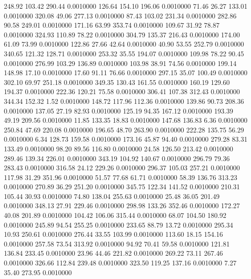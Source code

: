  248.92  103.42  290.44   0.0010000
 126.64  154.10  196.06   0.0010000
  71.46   26.27  133.01   0.0010000
 320.08   49.06  277.13   0.0010000
  87.43  103.02  231.34   0.0010000
 282.86   90.58  249.01   0.0010000
 171.16   63.99  353.74   0.0010000
 109.67   31.92   78.87   0.0010000
 324.93  110.89   78.22   0.0010000
 304.79  135.37  216.43   0.0010000
 174.00   61.09   73.99   0.0010000
 122.86   27.66   42.64   0.0010000
  40.90   53.55  252.79   0.0010000
 340.65  121.32  128.71   0.0010000
 253.32   35.55  194.07   0.0010000
 109.98   78.22   90.45   0.0010000
 276.99  103.29  136.89   0.0010000
 103.98   38.91   74.56   0.0010000
 199.14  148.98   17.10   0.0010000
  17.60   91.11   76.66   0.0010000
 297.15   35.07  100.49   0.0010000
 302.10   69.97  251.18   0.0010000
 349.35  130.43  161.55   0.0010000
 160.19  129.60  194.37   0.0010000
 222.36  120.21   75.58   0.0010000
 306.41  107.38  312.43   0.0010000
 344.34  152.32    1.52   0.0010000
 148.72  117.96  112.36   0.0010000
 139.86   90.73  208.36   0.0010000
 137.05   27.19   82.93   0.0010000
 125.19   94.35  167.12   0.0010000
 193.39   49.19  209.56   0.0010000
  11.85  133.35   18.83   0.0010000
 147.68  136.83    6.36   0.0010000
 250.84   47.69  220.08   0.0010000
 196.65   48.70  263.90   0.0010000
 222.28  135.75   56.29   0.0010000
   6.34  128.73  159.58   0.0010000
 173.16   45.87   94.40   0.0010000
 279.28   83.31  133.49   0.0010000
  98.20   89.56  116.80   0.0010000
  24.58  126.50  213.42   0.0010000
 289.46  139.34  226.01   0.0010000
 343.19  104.92  140.67   0.0010000
 296.79   79.36  283.43   0.0010000
 316.58   24.12  229.26   0.0010000
 296.37  105.03  257.21   0.0010000
 117.98   31.29  351.96   0.0010000
  51.57   77.68   61.71   0.0010000
  58.39  136.76  313.23   0.0010000
 270.89   36.29  251.20   0.0010000
 345.75  122.34  141.52   0.0010000
 210.31  105.44   30.93   0.0010000
  74.80  138.04  255.63   0.0010000
  25.48   36.05  201.49   0.0010000
 348.13   27.91  229.46   0.0010000
 298.98  133.26  352.46   0.0010000
 172.27   40.08  201.89   0.0010000
 104.42  106.06  315.44   0.0010000
  68.07  104.50  180.92   0.0010000
 245.89   94.54  255.25   0.0010000
 233.65   88.79   13.72   0.0010000
 295.34   10.93  250.61   0.0010000
 276.44   33.55  103.99   0.0010000
 113.60   18.15  154.16   0.0010000
 257.58   73.54  313.92   0.0010000
  94.92   70.41   59.58   0.0010000
 121.81  136.84  233.45   0.0010000
  23.96   44.46  221.82   0.0010000
 269.22   73.11  267.46   0.0010000
 326.66  112.84  239.48   0.0010000
 323.50  119.25  137.16   0.0010000
   7.27   35.40  273.95   0.0010000
